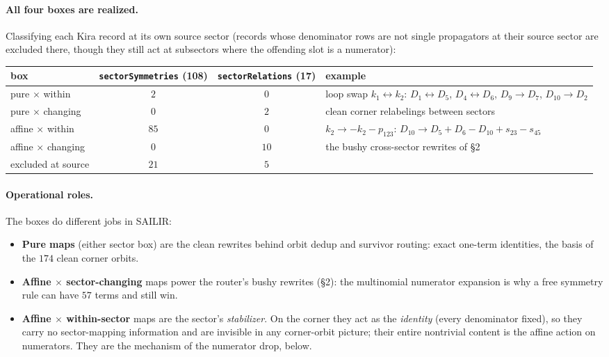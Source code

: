 \documentclass[11pt]{article}
\newcommand{\code}[1]{\texttt{#1}}
\begin{document}
\paragraph{All four boxes are realized.} Classifying each Kira record at its own source
sector (records whose denominator rows are not single propagators at their source sector
are excluded there, though they still act at subsectors where the offending slot is a
numerator):
\begin{center}
\footnotesize
\begin{tabular}{lccl}
\toprule
box & \code{sectorSymmetries} (108) & \code{sectorRelations} (17) & example \\
\midrule
pure $\times$ within      & $2$  & $0$  & loop swap $k_1\leftrightarrow k_2$: $D_1{\leftrightarrow}D_5$, $D_4{\leftrightarrow}D_6$, $D_9{\to}D_7$, $D_{10}{\to}D_2$ \\
pure $\times$ changing    & $0$  & $2$  & clean corner relabelings between sectors \\
affine $\times$ within    & $85$ & $0$  & $k_2\to-k_2-p_{123}$: $D_{10}\to D_5{+}D_6{-}D_{10}+s_{23}{-}s_{45}$ \\
affine $\times$ changing  & $0$  & $10$ & the bushy cross-sector rewrites of \S2 \\
excluded at source        & $21$ & $5$  & \\
\bottomrule
\end{tabular}
\end{center}

\paragraph{Operational roles.} The boxes do different jobs in SAILIR:
\begin{itemize}
\item \textbf{Pure maps} (either sector box) are the clean rewrites behind orbit
      dedup and survivor routing: exact one-term identities, the basis of the $174$
      clean corner orbits.
\item \textbf{Affine $\times$ sector-changing} maps power the router's bushy rewrites
      (\S2): the multinomial numerator expansion is why a free symmetry rule can have
      $57$ terms and still win.
\item \textbf{Affine $\times$ within-sector} maps are the sector's \emph{stabilizer}.
      On the corner they act as the \emph{identity} (every denominator fixed), so they
      carry no sector-mapping information and are invisible in any corner-orbit
      picture; their entire nontrivial content is the affine action on numerators. They
      are the mechanism of the numerator drop, below.
\end{itemize}
\end{document}
